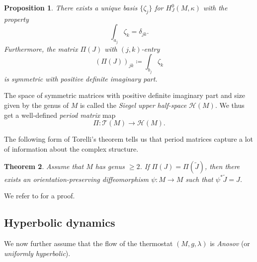 \documentclass[reqno,12pt,letterpaper]{amsart}
\newtheorem{proposition}{Proposition}[section]
\newtheorem{theorem}[proposition]{Theorem}
\theoremstyle{definition}
\theoremstyle{remark}
\theoremstyle{definition}
\numberwithin{equation}{section}
\begin{document}
\begin{proposition}
There exists a unique basis $\{\zeta_j\}$ for $H^0_J(M, \kappa)$ with the property
\begin{equation}\label{eq:basis-condition}
\int_{a_j}\zeta_k = \delta_{jk}.
\end{equation}
Furthermore, the matrix $\Pi(J)$ with $(j,k)$-entry
$$(\Pi(J))_{jk}\coloneqq\int_{b_j}\zeta_k$$
is symmetric with positive definite imaginary part. 
\end{proposition}
The space of symmetric matrices with positive definite imaginary part and size given by the genus of $M$ is called the \textit{Siegel upper half-space} $\mathcal{H}(M)$. We thus get a well-defined \textit{period matrix} map 
$$\Pi : \mathcal{T}(M)\to \mathcal{H}(M).$$ 

The following form of Torelli's theorem tells us that period matrices capture a lot of information about the complex structure. 
\begin{theorem}\label{theorem:torelli}
Assume that $M$ has genus $\geq 2$. If $\Pi(J)=\Pi(\widetilde{J})$, then there exists an orientation-preserving diffeomorphism $\psi: M\to M$ such that $\psi^*\widetilde{J}=J$. 
\end{theorem}
We refer to \cite[Theorem III.12.3]{farkas92} for a proof. 

\subsection{Hyperbolic dynamics}\label{subsection:hyperbolic-dynamics} We now further assume that the flow of the thermostat $(M, g, \lambda)$ is \textit{Anosov} (or \textit{uniformly hyperbolic}). 
\end{document}
